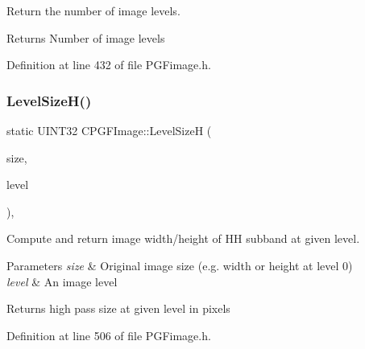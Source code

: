 Return the number of image levels. \begin{DoxyReturn}{Returns}
Number of image levels 
\end{DoxyReturn}


Definition at line 432 of file P\+G\+Fimage.\+h.


\begin{DoxyCode}{0}

\end{DoxyCode}
\mbox{\label{classCPGFImage_a96e7712f6033810f386a23f2faec0037}} 
\subsubsection{\texorpdfstring{LevelSizeH()}{LevelSizeH()}}
{\footnotesize\ttfamily static U\+I\+N\+T32 C\+P\+G\+F\+Image\+::\+Level\+SizeH (\begin{DoxyParamCaption}\item[{U\+I\+N\+T32}]{size,  }\item[{int}]{level }\end{DoxyParamCaption})\hspace{0.3cm}{\ttfamily [inline]}, {\ttfamily [static]}}

Compute and return image width/height of HH subband at given level. 
\begin{DoxyParams}{Parameters}
{\em size} & Original image size (e.\+g. width or height at level 0) \\
\hline
{\em level} & An image level \\
\hline
\end{DoxyParams}
\begin{DoxyReturn}{Returns}
high pass size at given level in pixels 
\end{DoxyReturn}


Definition at line 506 of file P\+G\+Fimage.\+h.


\begin{DoxyCode}{0}

\end{DoxyCode}
\mbox{\label{classCPGFImage_ad7e2f885a059a39ca15a47ecb497833b}} 

